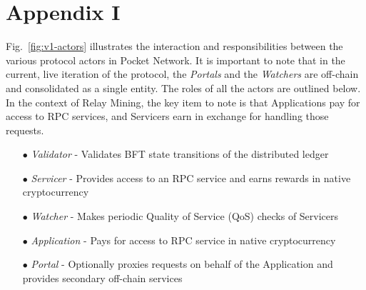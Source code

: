 \documentclass[runningheads]{llncs}
\begin{document}
\FloatBarrier



\newpage

\section*{Appendix I}

Fig.~\ref{fig:v1-actors} illustrates the interaction and responsibilities between the various protocol actors in Pocket Network. It is important to note that in the current, live iteration of the protocol, the \textit{Portals} and the \textit{Watchers} are off-chain and consolidated as a single entity. The roles of all the actors are outlined below. In the context of Relay Mining, the key item to note is that Applications pay for access to RPC services, and Servicers earn in exchange for handling those requests.

\begin{itemize}
    \item[$\bullet$] \textit{Validator} - Validates BFT state transitions of the distributed ledger
    \item[$\bullet$] \textit{Servicer} - Provides access to an RPC service and earns rewards in native cryptocurrency
    \item[$\bullet$] \textit{Watcher} - Makes periodic Quality of Service (QoS) checks of Servicers
    \item[$\bullet$] \textit{Application} - Pays for access to RPC service in native cryptocurrency
    \item[$\bullet$] \textit{Portal} - Optionally proxies requests on behalf of the Application and provides secondary off-chain services
\end{itemize}
\end{document}
